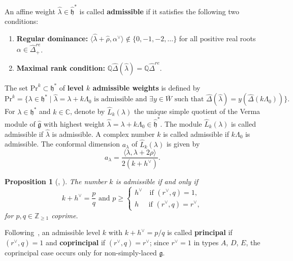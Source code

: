 \documentclass[12pt,a4paper,reqno]{amsart}
\numberwithin{equation}{section}
\newtheorem{proposition}[theorem]{Proposition}
\theoremstyle{definition}
\newcommand{\g}{\mathfrak{g}}
\newcommand{\C}{\mathbb{C}}
\newcommand{\Z}{\mathbb{Z}}
\def\Pr{\mathrm{Pr}}
\def\la{\lambda}
\def \h{\mathfrak{h}}
\begin{document}
An affine weight $\hat{\la} \in \hat{\mathfrak{h}}^*$ is called \textbf{admissible}\label{def:admissible} if it satisfies the following two conditions:
\begin{enumerate}
    \item \textbf{Regular dominance:}\label{cond:regdom} $\langle \hat{\la}+\hat{\rho}, \alpha^{\vee} \rangle \notin \{0, -1, -2, \dots \}$ for all positive real roots $\alpha \in \hat{\Delta}_{+}^{re}$.
    \item \textbf{Maximal rank condition:} $\mathbb{Q}\hat{\Delta}(\hat{\la}) = \mathbb{Q}\hat{\Delta}^{re}$.
\end{enumerate}

The set $\Pr^k \subset \mathfrak{h}^*$ of \textbf{level $k$ admissible weights} is defined by
\[
\Pr^k = \{ \la \in \mathfrak{h}^* \mid \hat{\la} = \la + k\Lambda_0 \text{ is admissible and } \exists y \in \overline{W} \text{ such that } \hat{\Delta}(\hat{\la}) = y ( \hat{\Delta}(k\Lambda_0)) \}.
\]
For $\la \in \h^*$ and $k\in \C$, denote by $\hat{L}_k(\la)$ the unique simple quotient of the Verma module of $\hat{\g}$ with highest weight $\hat\la=\la + k \Lambda_0 \in \hat{\h}^*$. The module $\hat{L}_k(\la)$ is called admissible if $\hat{\la}$ is admissible. A complex number $k$ is called admissible if $k \Lambda_0$ is admissible. The conformal dimension $a_\la$ of $\hat{L}_k(\la)$ is given by
\begin{equation}\label{eq:confdim_prelim}
a_\la = \frac{\langle \la, \la + 2\rho \rangle}{2(k + h^\vee)}.
\end{equation}
\begin{proposition}[{\cite[Theorems 2.1 and 2.2]{kac1989classification}, \cite[Proposition 1.1]{Kac2008}}]
    The number $k$ is admissible if and only if
    \begin{equation}
        k + h^\vee = \frac{p}{q} \text{ and } p \ge \begin{cases}
            h^\vee \quad \text{if } (r^\vee,q)=1,\\
            h \quad \ \,\text{if } (r^\vee, q) = r^\vee,
        \end{cases}
    \end{equation}
     for $p,q \in \Z_{\ge 1}$ coprime.
\end{proposition}
Following~\cite{kac1989classification,Kac2008}, an admissible level $k$ with $k+h^\vee=p/q$ is called \textbf{principal} if $(r^\vee,q)=1$ and \textbf{coprincipal} if $(r^\vee,q)=r^\vee$; since $r^\vee=1$ in types $A$, $D$, $E$, the coprincipal case occurs only for non-simply-laced $\g$.
\end{document}

